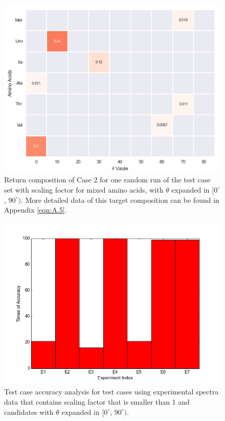 \begin{figure}[!ht] 
\centering
\includegraphics[scale=0.9]{Figures/chapter6_figure_two.png}
\caption{Return composition of Case 2 for one random run of the test case set with scaling foctor for mixed amino acids, with $\theta$ expanded in $[0^{\circ}$, $90^{\circ})$. More detailed data of this target composition can be found in Appendix \ref{eqn:A.5}.} \label{fig:6.2}
\end{figure}

\begin{figure}[!ht] 
\centering
\includegraphics[scale=0.6]{Figures/chapter6_1.png}
\caption{Test case accuracy analysis for test cases using experimental spectra data that contains scaling factor that is smaller than 1 and candidates with $\theta$ expanded in  $[0^{\circ}$, $90^{\circ})$.}
\label{fig:6.3}
\end{figure}

